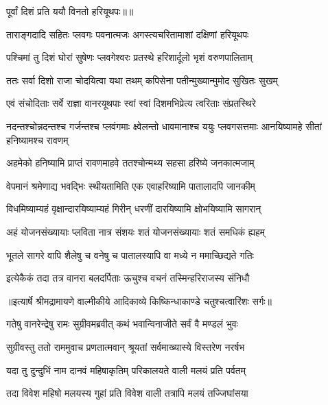 {पूर्वां दिशं प्रति ययौ विनतो हरियूथपः॥॥} %

\addtocounter{shlokacount}{1}

\twolineshloka
{ताराङ्गदादि सहितः प्लवगः पवनात्मजः}
{अगस्त्यचरितामाशां दक्षिणां हरियूथपः} %

\twolineshloka
{पश्चिमां तु दिशं घोरां सुषेणः प्लवगेश्वरः}
{प्रतस्थे हरिशार्दूलो भृशं वरुणपालिताम्} %

\twolineshloka
{ततः सर्वा दिशो राजा चोदयित्वा यथा तथम्}
{कपिसेना पतीन्मुख्यान्मुमोद सुखितः सुखम्} %

\twolineshloka
{एवं संचोदिताः सर्वे राज्ञा वानरयूथपाः}
{स्वां स्वां दिशमभिप्रेत्य त्वरिताः संप्रतस्थिरे} %

\threelineshloka
{नदन्तश्चोन्नदन्तश्च गर्जन्तश्च प्लवंगमाः}
{क्ष्वेलन्तो धावमानाश्च ययुः प्लवगसत्तमाः}
{आनयिष्यामहे सीतां हनिष्यामश्च रावणम्} %

\twolineshloka
{अहमेको हनिष्यामि प्राप्तं रावणमाहवे}
{ततश्चोन्मथ्य सहसा हरिष्ये जनकात्मजाम्} %

\twolineshloka
{वेपमानं श्रमेणाद्य भवद्भिः स्थीयतामिति}
{एक एवाहरिष्यामि पातालादपि जानकीम्} %

\twolineshloka
{विधमिष्याम्यहं वृक्षान्दारयिष्याम्यहं गिरीन्}
{धरणीं दारयिष्यामि क्षोभयिष्यामि सागरान्} %

\twolineshloka
{अहं योजनसंख्यायाः प्लविता नात्र संशयः}
{शतं योजनसंख्यायाः शतं समधिकं ह्यहम्} %

\twolineshloka
{भूतले सागरे वापि शैलेषु च वनेषु च}
{पातालस्यापि वा मध्ये न ममाच्छिद्यते गतिः} %

\twolineshloka
{इत्येकैकं तदा तत्र वानरा बलदर्पिताः}
{ऊचुश्च वचनं तस्मिन्हरिराजस्य संनिधौ} %


{॥इत्यार्षे श्रीमद्रामायणे वाल्मीकीये आदिकाव्ये किष्किन्धाकाण्डे चतुश्चत्वारिंशः सर्गः॥}


\twolineshloka
{गतेषु वानरेन्द्रेषु रामः सुग्रीवमब्रवीत्}
{कथं भवान्विनाजीते सर्वं वै मण्डलं भुवः} %

\twolineshloka
{सुग्रीवस्तु ततो राममुवाच प्रणतात्मवान्}
{श्रूयतां सर्वमाख्यास्ये विस्तरेण नरर्षभ} %

\twolineshloka
{यदा तु दुन्दुभिं नाम दानवं महिषाकृतिम्}
{परिकालयते वाली मलयं प्रति पर्वतम्} %

\twolineshloka
{तदा विवेश महिषो मलयस्य गुहां प्रति}
{विवेश वाली तत्रापि मलयं तज्जिघांसया} %

